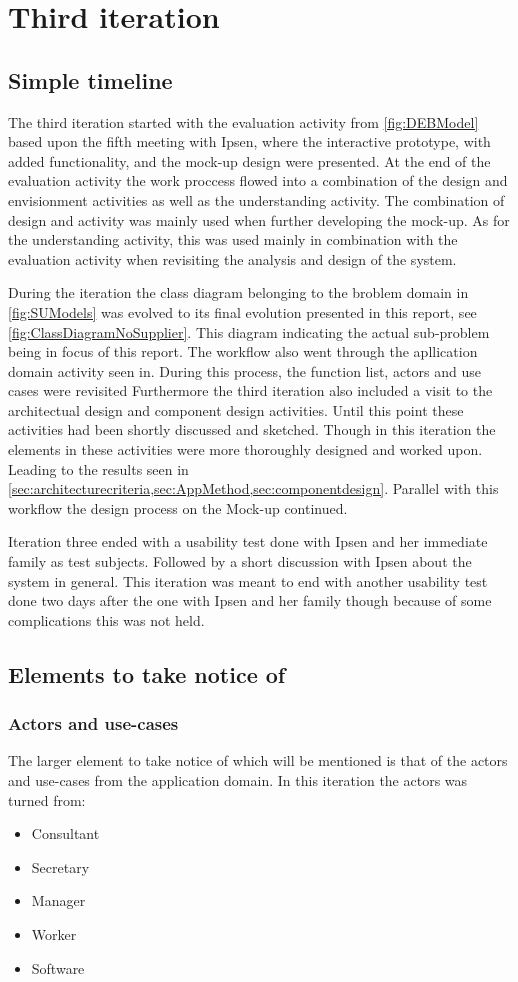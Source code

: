 \section{Third iteration}
\subsection{Simple timeline}\label{sec:3Iteration-timeline}
The third iteration started with the evaluation activity from \cref{fig:DEBModel} based upon the fifth meeting with Ipsen, where the interactive prototype, with added functionality, and the mock-up design were presented.
At the end of the evaluation activity the work proccess flowed into a combination of the design and envisionment activities as well as the understanding activity.
The combination of design and activity was mainly used when further developing the mock-up.
As for the understanding activity, this was used mainly in combination with the evaluation activity when revisiting the analysis and design of the system.

During the iteration the class diagram belonging to the broblem domain in \cref{fig:SUModels} was evolved to its final evolution presented in this report, see \cref{fig:ClassDiagramNoSupplier}.
This diagram indicating the actual sub-problem being in focus of this report.
The workflow also went through the apllication domain activity seen in.
During this process, the function list, actors and use cases were revisited
Furthermore the third iteration also included a visit to the architectual design and component design activities.
Until this point these activities had been shortly discussed and sketched.
Though in this iteration the elements in these activities were more thoroughly designed and worked upon.
Leading to the results seen in \cref{sec:architecturecriteria,sec:AppMethod,sec:componentdesign}.
Parallel with this workflow the design process on the Mock-up continued.

Iteration three ended with a usability test done with Ipsen and her immediate family as test subjects.
Followed by a short discussion with Ipsen about the system in general.
This iteration was meant to end with another usability test done two days after the one with Ipsen and her family though because of some complications this was not held.

\subsection{Elements to take notice of}
\subsubsection*{Actors and use-cases}
The larger element to take notice of which will be mentioned is that of the actors and use-cases from the application domain.
In this iteration the actors was turned from:
\begin{itemize}
	\item
	Consultant
	\item
	Secretary
	\item
	Manager
	\item
	Worker
	\item
	Software
\end{itemize}

